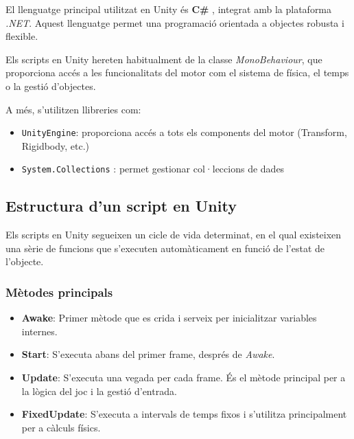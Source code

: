 \documentclass[12pt,a4paper]{report}
\begin{document}
El llenguatge principal utilitzat en Unity és \textbf{C\#} \cite{UnityProgrammingGuide}, integrat amb la plataforma \textit{.NET}. Aquest llenguatge permet una programació orientada a objectes robusta i flexible.

Els scripts en Unity hereten habitualment de la classe \textit{MonoBehaviour}, que proporciona accés a les funcionalitats del motor com el sistema de física, el temps o la gestió d'objectes.

A més, s'utilitzen llibreries com:

\begin{itemize}
\item \texttt{UnityEngine}: proporciona accés a tots els components del motor (Transform, Rigidbody, etc.)
\item \texttt{System.Collections} \cite{dotnet_collections}: permet gestionar col·leccions de dades
\end{itemize}


\subsection{Estructura d'un script en Unity}

Els scripts en Unity segueixen un cicle de vida determinat, en el qual existeixen una sèrie de funcions que s'executen automàticament en funció de l'estat de l'objecte.

\subsubsection{Mètodes principals}

\begin{itemize}

\item \textbf{Awake}: Primer mètode que es crida i serveix per inicialitzar variables internes.

\item \textbf{Start}:  
S'executa abans del primer frame, després de \textit{Awake}.\cite{UnityExecutionOrder}

\item \textbf{Update}:  
S'executa una vegada per cada frame. És el mètode principal per a la lògica del joc i la gestió d'entrada.

\item \textbf{FixedUpdate}:  
S'executa a intervals de temps fixos i s'utilitza principalment per a càlculs físics.

\end{itemize}
\end{document}
